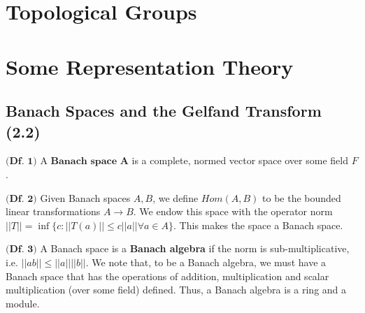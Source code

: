 \documentclass{article}
\title{\vspace{-6cm}}
\author{}
\date{}
\begin{document}
\tableofcontents
\newcommand{\R}{\mathbb{R}}
\newcommand{\C}{\mathbb{C}}
\newcommand{\thm}[1]{\textbf{(Th. #1)}} %
\newcommand{\lm}[1]{\textbf{(Lm. #1)}} %
\newcommand{\df}[1]{\textbf{(Df. #1)}} %
\newcommand{\cor}[1]{\textbf{(Cor. #1)}} %

\newcommand{\E}[1]{{\mathbb{E}}[#1]} %
\newcommand{\EF}[2][\mathcal{F}]{{\mathbb{E}}[#2|#1]} %
\newcommand{\F}[1][]{\mathcal{F}_{#1}} %
\newcommand{\prob}[1]{\mathbb{P}[#1]} %
\newcommand{\ra}{\rightarrow} %
\newcommand{\pf}{(\textbf{Pf.})}
\newcommand{\Rf}{\mathcal{R}}
\newcommand{\Cc}{\mathbb{C}}
\newcommand{\ccomp}{\mathcal{C}_C(G)}
\newcommand{\innprod}[2]{\langle #1 | #2 \rangle}
\newcommand{\dhat}[1]{\hat{\hat{#1}}}
\newcommand{\Q}{\mathbb{Q}}
\newcommand{\N}{\mathbb{N}}
\newcommand{\Z}{\mathbb{Z}}

 
\maketitle

\section{Topological Groups}

\section{Some Representation Theory}
\subsection{Banach Spaces and the Gelfand Transform (2.2)}

$\df{1}$ A $\textbf{Banach space A}$ is a complete, normed vector space over some field $F$.

$\df{2}$ Given Banach spaces $A,B$, we define $Hom(A,B)$ to be the bounded linear transformations $A \ra B$. We endow this space with the operator norm $||T|| = \inf \{c : ||T(a)|| \leq c ||a|| \forall a \in A \}$. This makes the space a Banach space.

$\df{3}$ A Banach space is a \textbf{Banach algebra} if the norm is sub-multiplicative, i.e. $||ab|| \leq ||a|| ||b||$. We note that, to be a Banach algebra, we must have a Banach space that has the operations of addition, multiplication and scalar multiplication (over some field) defined. Thus, a Banach algebra is a ring and a module.
\end{document}
